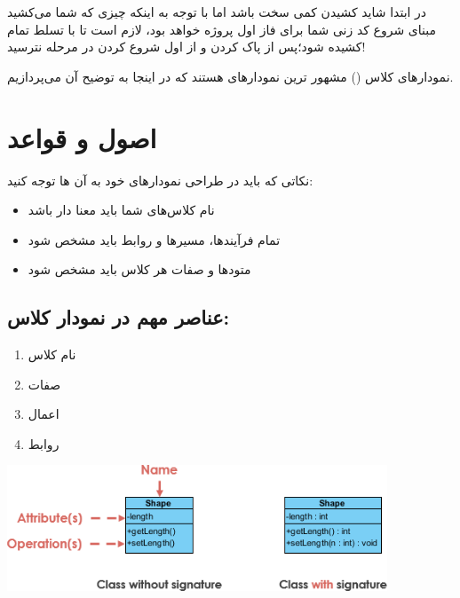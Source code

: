 \documentclass[]{article}
\begin{document}
در ابتدا شاید کشیدن  کمی سخت باشد اما با توجه به اینکه چیزی که شما می‌کشید مبنای شروع کد زنی شما برای فاز اول پروژه خواهد بود، لازم است تا با تسلط تمام کشیده شود؛پس از پاک کردن و از اول شروع کردن در مرحله  نترسید! 

نمودارهای کلاس () مشهور ترین نمودارهای  هستند که در اینجا به توضیح آن می‌پردازیم.

\newpage

\section*{{\titr اصول و قواعد }}

نکاتی که باید در طراحی نمودارهای خود به آن ها توجه کنید:

\begin{itemize}

\item
نام کلاس‌های شما باید معنا دار باشد

\item
تمام فرآیندها، مسیرها و روابط باید مشخص شود

\item
متودها و صفات هر کلاس باید مشخص شود



\end{itemize}


\subsection*{{\titr عناصر مهم در نمودار کلاس:}}

\begin{enumerate}

\item

نام کلاس

\item
صفات

\item
اعمال

\item
روابط

\end{enumerate}


\begin{center}

\includegraphics[width=0.85\textwidth]{images/image11.png}

\end{center}
\end{document}

